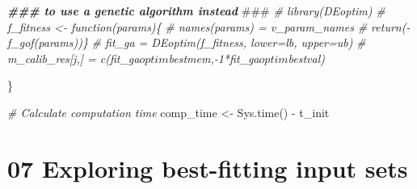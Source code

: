 \documentclass[
]{article}
\newenvironment{Shaded}{\begin{snugshade}}{\end{snugshade}}
\newcommand{\AlertTok}[1]{\textcolor[rgb]{0.94,0.16,0.16}{#1}}
\newcommand{\CommentTok}[1]{\textcolor[rgb]{0.56,0.35,0.01}{\textit{#1}}}
\newcommand{\DocumentationTok}[1]{\textcolor[rgb]{0.56,0.35,0.01}{\textbf{\textit{#1}}}}
\newcommand{\FunctionTok}[1]{\textcolor[rgb]{0.00,0.00,0.00}{#1}}
\newcommand{\NormalTok}[1]{#1}
\newcommand{\OtherTok}[1]{\textcolor[rgb]{0.56,0.35,0.01}{#1}}
\newcommand{\SpecialCharTok}[1]{\textcolor[rgb]{0.00,0.00,0.00}{#1}}
\begin{document}
\begin{Shaded}
\begin{Highlighting}[]
  \DocumentationTok{\#\#\# to use a genetic algorithm instead }\AlertTok{\#\#\#}
  \CommentTok{\# library(DEoptim)}
  \CommentTok{\# f\_fitness \textless{}{-} function(params)\{}
  \CommentTok{\#   names(params) = v\_param\_names}
  \CommentTok{\#   return({-}f\_gof(params))\}}
  \CommentTok{\# fit\_ga = DEoptim(f\_fitness, lower=lb, upper=ub)}
  \CommentTok{\# m\_calib\_res[j,] = c(fit\_ga$optim$bestmem,{-}1*fit\_ga$optim$bestval)}

\NormalTok{  \}}

\CommentTok{\# Calculate computation time}
\NormalTok{comp\_time }\OtherTok{\textless{}{-}} \FunctionTok{Sys.time}\NormalTok{() }\SpecialCharTok{{-}}\NormalTok{ t\_init}
\end{Highlighting}
\end{Shaded}

\hypertarget{exploring-best-fitting-input-sets}{%
\section{07 Exploring best-fitting input
sets}\label{exploring-best-fitting-input-sets}}
\end{document}
